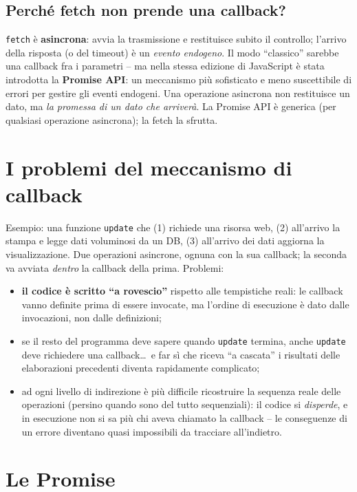 \subsection{Perch\'e fetch non prende una callback?}
\texttt{fetch} \`e \textbf{asincrona}: avvia la trasmissione e restituisce subito il
controllo; l'arrivo della risposta (o del timeout) \`e un \emph{evento endogeno}. Il modo
``classico'' sarebbe una callback fra i parametri -- ma nella stessa edizione di JavaScript
\`e stata introdotta la \textbf{Promise API}: un meccanismo pi\`u sofisticato e meno
suscettibile di errori per gestire gli eventi endogeni. Una operazione asincrona non
restituisce un dato, ma \emph{la promessa di un dato che arriver\`a}. La Promise API \`e
generica (per qualsiasi operazione asincrona); la fetch la sfrutta.

\section{I problemi del meccanismo di callback}

Esempio: una funzione \texttt{update} che (1) richiede una risorsa web, (2) all'arrivo la
stampa e legge dati voluminosi da un DB, (3) all'arrivo dei dati aggiorna la visualizzazione.
Due operazioni asincrone, ognuna con la sua callback; la seconda va avviata \emph{dentro} la
callback della prima. Problemi:
\begin{itemize}
  \item \textbf{il codice \`e scritto ``a rovescio''} rispetto alle tempistiche reali: le
        callback vanno definite prima di essere invocate, ma l'ordine di esecuzione \`e dato
        dalle invocazioni, non dalle definizioni;
  \item se il resto del programma deve sapere quando \texttt{update} termina, anche
        \texttt{update} deve richiedere una callback\dots\ e far s\`i che riceva ``a cascata''
        i risultati delle elaborazioni precedenti diventa rapidamente complicato;
  \item ad ogni livello di indirezione \`e pi\`u difficile ricostruire la sequenza reale
        delle operazioni (persino quando sono del tutto sequenziali): il codice si
        \emph{disperde}, e in esecuzione non si sa pi\`u chi aveva chiamato la callback --
        le conseguenze di un errore diventano quasi impossibili da tracciare all'indietro.
\end{itemize}

\section{Le Promise}

